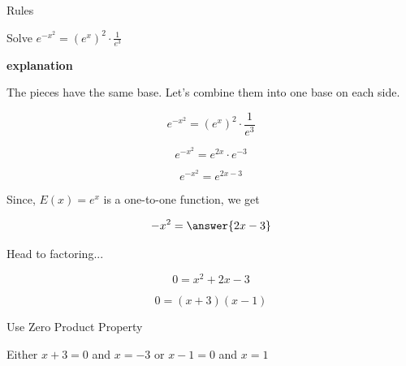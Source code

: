 \documentclass{ximera}
\begin{document}
\begin{example} Rules



Solve $e^{- x^2} = \left(e^x\right)^2 \cdot \frac{1}{e^3}$


\textbf{\textcolor{red!75!green}{explanation}} 

The pieces have the same base.  Let's combine them into one base on each side.



\[  e^{- x^2} = \left(e^x\right)^2 \cdot \frac{1}{e^3}     \]

\[  e^{- x^2}  = e^{2x} \cdot e^{-3} \]

\[  e^{- x^2}  = e^{2x-3}  \]



Since, $E(x) = e^x$ is a one-to-one function, we get


\[  -x^2 = \answer{2x - 3}  \]


Head to factoring...


\[  0 = x^2 + 2x - 3  \]


\[  0 =(x+3)(x-1) \]


Use Zero Product Property



Either  $x+3 = 0$ and $x = -3$  or $x-1=0$ and $x = 1$



\end{example}
\end{document}

